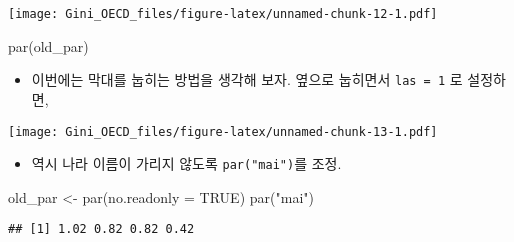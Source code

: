 \documentclass[
]{article}
\newenvironment{Shaded}{\begin{snugshade}}{\end{snugshade}}
\newcommand{\AttributeTok}[1]{\textcolor[rgb]{0.77,0.63,0.00}{#1}}
\newcommand{\ConstantTok}[1]{\textcolor[rgb]{0.00,0.00,0.00}{#1}}
\newcommand{\DecValTok}[1]{\textcolor[rgb]{0.00,0.00,0.81}{#1}}
\newcommand{\FunctionTok}[1]{\textcolor[rgb]{0.00,0.00,0.00}{#1}}
\newcommand{\NormalTok}[1]{#1}
\newcommand{\OtherTok}[1]{\textcolor[rgb]{0.56,0.35,0.01}{#1}}
\newcommand{\SpecialCharTok}[1]{\textcolor[rgb]{0.00,0.00,0.00}{#1}}
\newcommand{\StringTok}[1]{\textcolor[rgb]{0.31,0.60,0.02}{#1}}
\providecommand{\tightlist}{%
  \setlength{\itemsep}{0pt}\setlength{\parskip}{0pt}}
\begin{document}
\texttt{[image: Gini\_OECD\_files/figure-latex/unnamed-chunk-12-1.pdf]}

\begin{Shaded}
\begin{Highlighting}[]
\FunctionTok{par}\NormalTok{(old\_par)}
\end{Highlighting}
\end{Shaded}

\begin{itemize}
\tightlist
\item
  이번에는 막대를 눕히는 방법을 생각해 보자. 옆으로 눕히면서
  \texttt{las\ =\ 1} 로 설정하면,
\end{itemize}

\begin{Shaded}
\end{Shaded}

\texttt{[image: Gini\_OECD\_files/figure-latex/unnamed-chunk-13-1.pdf]}

\begin{itemize}
\tightlist
\item
  역시 나라 이름이 가리지 않도록 \texttt{par("mai")}를 조정.
\end{itemize}

\begin{Shaded}
\begin{Highlighting}[]
\NormalTok{old\_par }\OtherTok{\textless{}{-}} \FunctionTok{par}\NormalTok{(}\AttributeTok{no.readonly =} \ConstantTok{TRUE}\NormalTok{)}
\FunctionTok{par}\NormalTok{(}\StringTok{"mai"}\NormalTok{)}
\end{Highlighting}
\end{Shaded}

\begin{verbatim}
## [1] 1.02 0.82 0.82 0.42
\end{verbatim}
\end{document}
